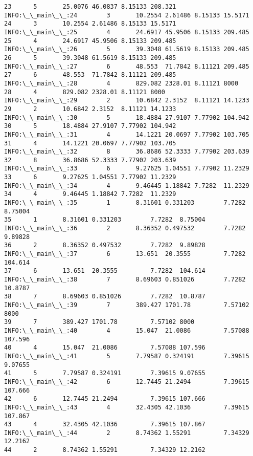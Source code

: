 \documentclass[11pt]{article}
\begin{document}
\begin{Verbatim}[commandchars=\\\{\}]
23      5       25.0076 46.0837 8.15133 208.321
INFO:\_\_main\_\_:24        3       10.2554 2.61486 8.15133 15.5171
24      3       10.2554 2.61486 8.15133 15.5171
INFO:\_\_main\_\_:25        4       24.6917 45.9506 8.15133 209.485
25      4       24.6917 45.9506 8.15133 209.485
INFO:\_\_main\_\_:26        5       39.3048 61.5619 8.15133 209.485
26      5       39.3048 61.5619 8.15133 209.485
INFO:\_\_main\_\_:27        6       48.553  71.7842 8.11121 209.485
27      6       48.553  71.7842 8.11121 209.485
INFO:\_\_main\_\_:28        4       829.082 2328.01 8.11121 8000
28      4       829.082 2328.01 8.11121 8000
INFO:\_\_main\_\_:29        2       10.6842 2.3152  8.11121 14.1233
29      2       10.6842 2.3152  8.11121 14.1233
INFO:\_\_main\_\_:30        5       18.4884 27.9107 7.77902 104.942
30      5       18.4884 27.9107 7.77902 104.942
INFO:\_\_main\_\_:31        4       14.1221 20.0697 7.77902 103.705
31      4       14.1221 20.0697 7.77902 103.705
INFO:\_\_main\_\_:32        8       36.8686 52.3333 7.77902 203.639
32      8       36.8686 52.3333 7.77902 203.639
INFO:\_\_main\_\_:33        6       9.27625 1.04551 7.77902 11.2329
33      6       9.27625 1.04551 7.77902 11.2329
INFO:\_\_main\_\_:34        4       9.46445 1.18842 7.7282  11.2329
34      4       9.46445 1.18842 7.7282  11.2329
INFO:\_\_main\_\_:35        1       8.31601 0.331203        7.7282  8.75004
35      1       8.31601 0.331203        7.7282  8.75004
INFO:\_\_main\_\_:36        2       8.36352 0.497532        7.7282  9.89828
36      2       8.36352 0.497532        7.7282  9.89828
INFO:\_\_main\_\_:37        6       13.651  20.3555         7.7282  104.614
37      6       13.651  20.3555         7.7282  104.614
INFO:\_\_main\_\_:38        7       8.69603 0.851026        7.7282  10.8787
38      7       8.69603 0.851026        7.7282  10.8787
INFO:\_\_main\_\_:39        7       389.427 1701.78         7.57102 8000
39      7       389.427 1701.78         7.57102 8000
INFO:\_\_main\_\_:40        4       15.047  21.0086         7.57088 107.596
40      4       15.047  21.0086         7.57088 107.596
INFO:\_\_main\_\_:41        5       7.79587 0.324191        7.39615 9.07655
41      5       7.79587 0.324191        7.39615 9.07655
INFO:\_\_main\_\_:42        6       12.7445 21.2494         7.39615 107.666
42      6       12.7445 21.2494         7.39615 107.666
INFO:\_\_main\_\_:43        4       32.4305 42.1036         7.39615 107.867
43      4       32.4305 42.1036         7.39615 107.867
INFO:\_\_main\_\_:44        2       8.74362 1.55291         7.34329 12.2162
44      2       8.74362 1.55291         7.34329 12.2162

\end{Verbatim}
\end{document}
